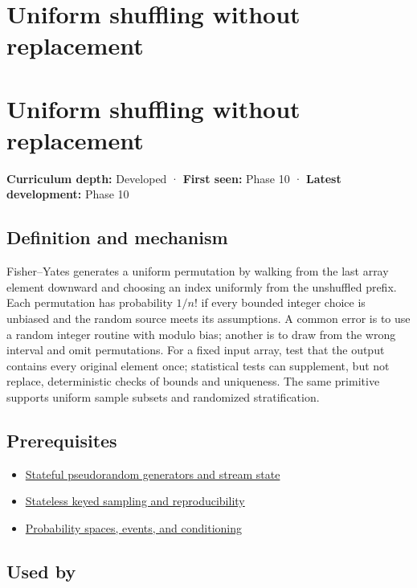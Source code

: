\hypertarget{appendix-184fcc411663}{}
\section*{Uniform shuffling without replacement}
\section{Uniform shuffling without replacement}\label{uniform-shuffling-without-replacement}

\textbf{Curriculum depth:} Developed · \textbf{First seen:} Phase 10 · \textbf{Latest development:} Phase 10

\subsection{Definition and mechanism}\label{definition-and-mechanism}

Fisher--Yates generates a uniform permutation by walking from the last array element downward and choosing an index uniformly from the unshuffled prefix. Each permutation has probability \(1/n!\) if every bounded integer choice is unbiased and the random source meets its assumptions. A common error is to use a random integer routine with modulo bias; another is to draw from the wrong interval and omit permutations. For a fixed input array, test that the output contains every original element once; statistical tests can supplement, but not replace, deterministic checks of bounds and uniqueness. The same primitive supports uniform sample subsets and randomized stratification.

\subsection{Prerequisites}\label{prerequisites}

\begin{itemize}
\tightlist
\item
  \hyperref[appendix-e0f7c7e08f3a]{Stateful pseudorandom generators and stream state}
\item
  \hyperref[appendix-daaf25bfd3a0]{Stateless keyed sampling and reproducibility}
\item
  \hyperref[appendix-f1ef323f6ed7]{Probability spaces, events, and conditioning}
\end{itemize}

\subsection{Used by}\label{used-by}

